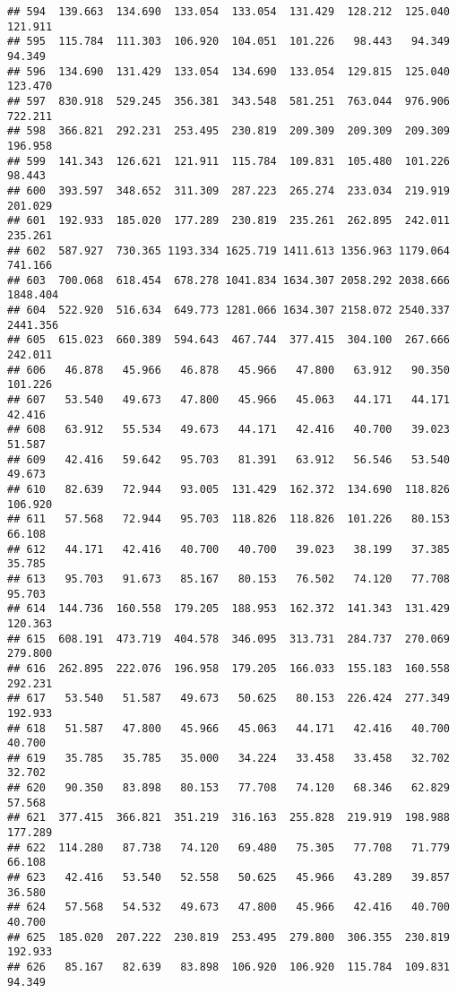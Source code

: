 \documentclass[
]{article}
\begin{document}
\begin{verbatim}
## 594  139.663  134.690  133.054  133.054  131.429  128.212  125.040  121.911
## 595  115.784  111.303  106.920  104.051  101.226   98.443   94.349   94.349
## 596  134.690  131.429  133.054  134.690  133.054  129.815  125.040  123.470
## 597  830.918  529.245  356.381  343.548  581.251  763.044  976.906  722.211
## 598  366.821  292.231  253.495  230.819  209.309  209.309  209.309  196.958
## 599  141.343  126.621  121.911  115.784  109.831  105.480  101.226   98.443
## 600  393.597  348.652  311.309  287.223  265.274  233.034  219.919  201.029
## 601  192.933  185.020  177.289  230.819  235.261  262.895  242.011  235.261
## 602  587.927  730.365 1193.334 1625.719 1411.613 1356.963 1179.064  741.166
## 603  700.068  618.454  678.278 1041.834 1634.307 2058.292 2038.666 1848.404
## 604  522.920  516.634  649.773 1281.066 1634.307 2158.072 2540.337 2441.356
## 605  615.023  660.389  594.643  467.744  377.415  304.100  267.666  242.011
## 606   46.878   45.966   46.878   45.966   47.800   63.912   90.350  101.226
## 607   53.540   49.673   47.800   45.966   45.063   44.171   44.171   42.416
## 608   63.912   55.534   49.673   44.171   42.416   40.700   39.023   51.587
## 609   42.416   59.642   95.703   81.391   63.912   56.546   53.540   49.673
## 610   82.639   72.944   93.005  131.429  162.372  134.690  118.826  106.920
## 611   57.568   72.944   95.703  118.826  118.826  101.226   80.153   66.108
## 612   44.171   42.416   40.700   40.700   39.023   38.199   37.385   35.785
## 613   95.703   91.673   85.167   80.153   76.502   74.120   77.708   95.703
## 614  144.736  160.558  179.205  188.953  162.372  141.343  131.429  120.363
## 615  608.191  473.719  404.578  346.095  313.731  284.737  270.069  279.800
## 616  262.895  222.076  196.958  179.205  166.033  155.183  160.558  292.231
## 617   53.540   51.587   49.673   50.625   80.153  226.424  277.349  192.933
## 618   51.587   47.800   45.966   45.063   44.171   42.416   40.700   40.700
## 619   35.785   35.785   35.000   34.224   33.458   33.458   32.702   32.702
## 620   90.350   83.898   80.153   77.708   74.120   68.346   62.829   57.568
## 621  377.415  366.821  351.219  316.163  255.828  219.919  198.988  177.289
## 622  114.280   87.738   74.120   69.480   75.305   77.708   71.779   66.108
## 623   42.416   53.540   52.558   50.625   45.966   43.289   39.857   36.580
## 624   57.568   54.532   49.673   47.800   45.966   42.416   40.700   40.700
## 625  185.020  207.222  230.819  253.495  279.800  306.355  230.819  192.933
## 626   85.167   82.639   83.898  106.920  106.920  115.784  109.831   94.349

\end{verbatim}
\end{document}
